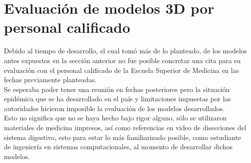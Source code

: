 \section{Evaluación de modelos 3D por personal calificado}
Debido al tiempo de desarrollo, el cual tomó más de lo planteado, de los modelos antes expuestos en la sección anterior no fue posible concretar una cita 
para su evaluación con el personal calificado  de la Escuela Superior de Medicina en las fechas previamente planteadas.\\
Se esperaba poder tener una reunión en fechas posteriores pero la situación epidémica que se ha desarrollado en el país y 
limitaciones impuestas por las autoridades hicieron imposible la evaluación de los modelos desarrollados.\\
Esto no significa que no se haya hecho bajo rigor alguno, sólo se utilizaron materiales de medicina impresos, así como 
referencias en video de disecciones del sistema digestivo, esto para estar lo más familiarizado posible, como estudiante 
de ingeniería en sistemas computacionales, al momento de desarrollar dichos modelos.\\
